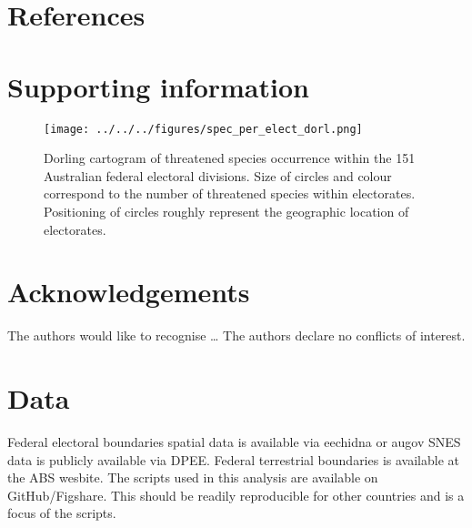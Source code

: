 \documentclass[a4paper,11pt]{article}
\begin{document}
\newpage
\nolinenumbers
\section{References}
\printbibliography

\newpage
\section{Supporting information}

\begin{figure}[H]
	\centering
    \texttt{[image: ../../../figures/spec\_per\_elect\_dorl.png]}
    \caption{Dorling cartogram of threatened species occurrence within the 151 Australian federal electoral divisions. Size of circles and colour correspond to the number of threatened species within electorates. Positioning of circles roughly represent the geographic location of electorates.}
    \label{fig:dorl}
\end{figure}

\newpage
\section{Acknowledgements}
The authors would like to recognise \ldots
The authors declare no conflicts of interest.

\newpage
\section{Data}
Federal electoral boundaries spatial data is available via eechidna or augov
SNES data is publicly available via DPEE.
Federal terrestrial boundaries is available at the ABS wesbite.
The scripts used in this analysis are available on GitHub/Figshare. This should be readily reproducible for other countries and is a focus of the scripts.
\end{document}
